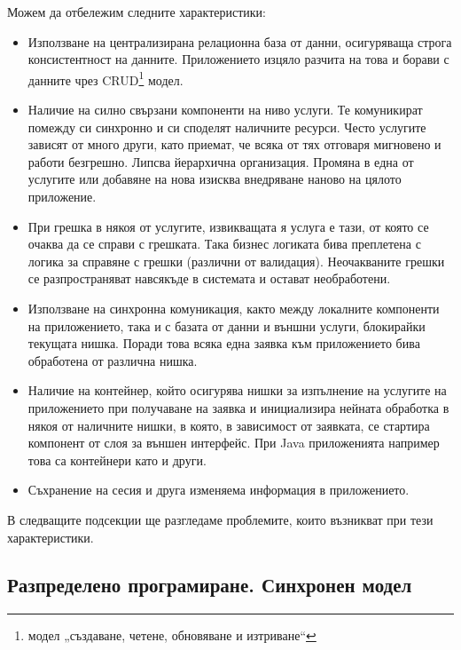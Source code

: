 Можем да отбележим следните характеристики:

\begin{itemize}
  \item Използване на централизирана релационна база от данни, осигуряваща строга консистентност на данните. Приложението изцяло разчита на това и борави с данните чрез CRUD\footnote{модел „създаване, четене, обновяване и изтриване“} модел.
  
  \item Наличие на силно свързани компоненти на ниво услуги. Те комуникират помежду си синхронно и си споделят наличните ресурси. Често услугите зависят от много други, като приемат, че всяка от тях отговаря мигновено и работи безгрешно. Липсва йерархична организация. Промяна в една от услугите или добавяне на нова изисква внедряване наново на цялото приложение.
  
  \item При грешка в някоя от услугите, извикващата я услуга е тази, от която се очаква да се справи с грешката. Така бизнес логиката бива преплетена с логика за справяне с грешки (различни от валидация). Неочакваните грешки се разпространяват навсякъде в системата и остават необработени.
  
  \item Използване на синхронна комуникация, както между локалните компоненти на приложението, така и с базата от данни и външни услуги, блокирайки текущата нишка. Поради това всяка една заявка към приложението бива обработена от различна нишка.
  
  \item Наличие на контейнер, който осигурява нишки за изпълнение на услугите на приложението при получаване на заявка и инициализира нейната обработка в някоя от наличните нишки, в която, в зависимост от заявката, се стартира компонент от слоя за външен интерфейс. При Java приложенията например това са контейнери като  и други.
  
  \item Съхранение на сесия и друга изменяема информация в приложението.
\end{itemize}

В следващите подсекции ще разгледаме проблемите, които възникват при тези характеристики.

\subsection{Разпределено програмиране. Синхронен модел}
\label{sec:synchronous-model}

